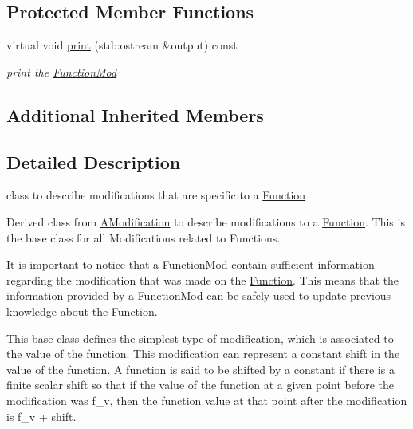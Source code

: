 \subsection*{Protected Member Functions}
\begin{DoxyCompactItemize}
\item 
\mbox{\label{class_s_m_spp__di__unipi__it_1_1_function_mod_a2e7b9c9148a98c5c342e8c25cac95926}} 
virtual void \mbox{\hyperlink{class_s_m_spp__di__unipi__it_1_1_function_mod_a2e7b9c9148a98c5c342e8c25cac95926}{print}} (std\+::ostream \&output) const
\begin{DoxyCompactList}\small\item\em print the \mbox{\hyperlink{class_s_m_spp__di__unipi__it_1_1_function_mod}{Function\+Mod}} \end{DoxyCompactList}\end{DoxyCompactItemize}
\subsection*{Additional Inherited Members}


\subsection{Detailed Description}
class to describe modifications that are specific to a \mbox{\hyperlink{class_s_m_spp__di__unipi__it_1_1_function}{Function}} 

Derived class from \mbox{\hyperlink{class_s_m_spp__di__unipi__it_1_1_a_modification}{A\+Modification}} to describe modifications to a \mbox{\hyperlink{class_s_m_spp__di__unipi__it_1_1_function}{Function}}. This is the base class for all Modifications related to Functions.

It is important to notice that a \mbox{\hyperlink{class_s_m_spp__di__unipi__it_1_1_function_mod}{Function\+Mod}} contain sufficient information regarding the modification that was made on the \mbox{\hyperlink{class_s_m_spp__di__unipi__it_1_1_function}{Function}}. This means that the information provided by a \mbox{\hyperlink{class_s_m_spp__di__unipi__it_1_1_function_mod}{Function\+Mod}} can be safely used to update previous knowledge about the \mbox{\hyperlink{class_s_m_spp__di__unipi__it_1_1_function}{Function}}.

This base class defines the simplest type of modification, which is associated to the value of the function. This modification can represent a constant shift in the value of the function. A function is said to be shifted by a constant if there is a finite scalar shift so that if the value of the function at a given point before the modification was f\+\_\+v, then the function value at that point after the modification is f\+\_\+v + shift.


